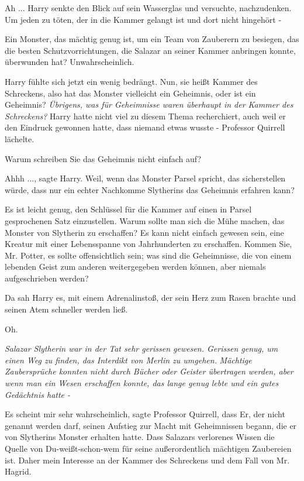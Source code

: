 \glqq{}Ah ...\grqq{} Harry senkte den Blick auf sein Wasserglas und versuchte,
nachzudenken. \glqq{}Um jeden zu töten, der in die Kammer gelangt ist und dort
nicht hingehört -\grqq{}

\glqq{}Ein Monster, das mächtig genug ist, um ein Team von Zauberern zu besiegen,
das die besten Schutzvorrichtungen, die Salazar an seiner Kammer anbringen
konnte, überwunden hat? Unwahrscheinlich.\grqq{}

Harry fühlte sich jetzt ein wenig bedrängt. \glqq{}Nun, sie heißt Kammer des
Schreckens, also hat das Monster vielleicht ein Geheimnis, oder ist ein
Geheimnis?\grqq{} \emph{Übrigens, was für Geheimnisse waren überhaupt in der Kammer
des Schreckens?} Harry hatte nicht viel zu diesem Thema recherchiert, auch weil
er den Eindruck gewonnen hatte, dass niemand etwas wusste - Professor Quirrell
lächelte.

\glqq{}Warum schreiben Sie das Geheimnis nicht einfach auf?\grqq{}

\glqq{}Ahhh ...\grqq{}, sagte Harry. \glqq{}Weil, wenn das Monster Parsel spricht,
das sicherstellen würde, dass nur ein echter Nachkomme Slytherins das Geheimnis
erfahren kann?\grqq{}

\glqq{}Es ist leicht genug, den Schlüssel für die Kammer auf einen in Parsel
gesprochenen Satz einzustellen. Warum sollte man sich die Mühe machen, das
Monster von Slytherin zu erschaffen? Es kann nicht einfach gewesen sein, eine
Kreatur mit einer Lebensspanne von Jahrhunderten zu erschaffen. Kommen Sie, Mr.
Potter, es sollte offensichtlich sein; was sind die Geheimnisse, die von einem
lebenden Geist zum anderen weitergegeben werden können, aber niemals
aufgeschrieben werden?\grqq{}

Da sah Harry es, mit einem Adrenalinstoß, der sein Herz zum Rasen brachte und
seinen Atem schneller werden ließ.

\glqq{}Oh.\grqq{}

\emph{Salazar Slytherin war in der Tat sehr gerissen gewesen. Gerissen genug,
um einen Weg zu finden, das Interdikt von Merlin zu umgehen.}
\emph{Mächtige Zaubersprüche konnten nicht durch Bücher oder Geister übertragen
werden, aber wenn man ein Wesen erschaffen konnte, das lange genug lebte und ein
gutes Gedächtnis hatte -}

\glqq{}Es scheint mir sehr wahrscheinlich\grqq{}, sagte Professor Quirrell, \glqq{}
dass Er, der nicht genannt werden darf, seinen Aufstieg zur Macht mit
Geheimnissen begann, die er von Slytherins Monster erhalten hatte. Dass Salazars
verlorenes Wissen die Quelle von Du-weißt-schon-wem für seine außerordentlich
mächtigen Zaubereien ist. Daher mein Interesse an der Kammer des Schreckens und
dem Fall von Mr. Hagrid.\grqq{}

